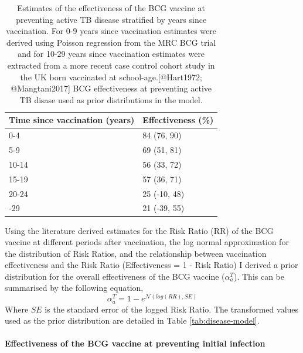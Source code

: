 \documentclass[11pt,twoside]{bristolthesis}
\begin{document}
  \begin{table}[!h]
  
  \caption{\label{tab:bcg-eff-est}Estimates of the effectiveness of the BCG vaccine at preventing active TB disease stratified by years since vaccination. For 0-9 years since vaccination estimates were derived using Poisson regression from the MRC BCG trial and for 10-29 years since vaccination estimates were extracted from a more recent case control cohort study in the UK born vaccinated at school-age.[@Hart1972; @Mangtani2017] BCG effectiveness at preventing active TB disase used as prior distributions in the model.}
  \centering
  \begin{tabular}{ll}
  \toprule
  Time since vaccination (years) & Effectiveness (\%)\\
  \midrule
  0-4 & 84 (76, 90)\\
  5-9 & 69 (51, 81)\\
  10-14 & 56 (33, 72)\\
  15-19 & 57 (36, 71)\\
  20-24 & 25 (-10, 48)\\
  \addlinespace
  25-29 & 21 (-39, 55)\\
  \bottomrule
  \end{tabular}
  \end{table}
  Using the literature derived estimates for the Risk Ratio (RR) of the BCG vaccine at different periods after vaccination, the log normal approximation for the distribution of Risk Ratios, and the relationship between vaccination effectiveness and the Risk Ratio (Effectiveness = 1 - Risk Ratio) I derived a prior distribution for the overall effectiveness of the BCG vaccine (\(\alpha^T_a\)). This can be summarised by the following equation,
  \begin{equation}
    \alpha^T_a = 1 - e^{\mathcal{N}(log(RR), SE)}
    \label{eq:rr-to-alpha}
  \end{equation}
  Where \(SE\) is the standard error of the logged Risk Ratio. The transformed values used as the prior distribution are detailed in Table \ref{tab:disease-model}.
  
  \hypertarget{effectiveness-of-the-bcg-vaccine-at-preventing-initial-infection}{%
  \paragraph{Effectiveness of the BCG vaccine at preventing initial infection}\label{effectiveness-of-the-bcg-vaccine-at-preventing-initial-infection}}
  
\end{document}
